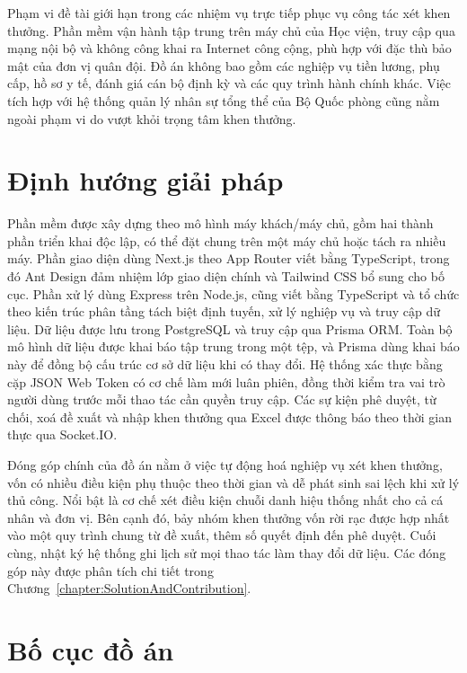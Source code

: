\documentclass[../DoAn.tex]{subfiles}
\begin{document}
Phạm vi đề tài giới hạn trong các nhiệm vụ trực tiếp phục vụ công tác xét khen thưởng.
Phần mềm vận hành tập trung trên máy chủ của Học viện, truy cập qua mạng nội bộ và không công khai ra Internet công cộng, phù hợp với đặc thù bảo mật của đơn vị quân đội.
Đồ án không bao gồm các nghiệp vụ tiền lương, phụ cấp, hồ sơ y tế, đánh giá cán bộ định kỳ và các quy trình hành chính khác.
Việc tích hợp với hệ thống quản lý nhân sự tổng thể của Bộ Quốc phòng cũng nằm ngoài phạm vi do vượt khỏi trọng tâm khen thưởng.

\section{Định hướng giải pháp}
\label{section:1.3}

Phần mềm được xây dựng theo mô hình máy khách/máy chủ, gồm hai thành phần triển khai độc lập, có thể đặt chung trên một máy chủ hoặc tách ra nhiều máy.
Phần giao diện dùng Next.js theo App Router viết bằng TypeScript, trong đó Ant Design đảm nhiệm lớp giao diện chính và Tailwind CSS bổ sung cho bố cục.
Phần xử lý dùng Express trên Node.js, cũng viết bằng TypeScript và tổ chức theo kiến trúc phân tầng tách biệt định tuyến, xử lý nghiệp vụ và truy cập dữ liệu.
Dữ liệu được lưu trong PostgreSQL và truy cập qua Prisma ORM. Toàn bộ mô hình dữ liệu được khai báo tập trung trong một tệp, và Prisma dùng khai báo này để đồng bộ cấu trúc cơ sở dữ liệu khi có thay đổi.
Hệ thống xác thực bằng cặp JSON Web Token có cơ chế làm mới luân phiên, đồng thời kiểm tra vai trò người dùng trước mỗi thao tác cần quyền truy cập.
Các sự kiện phê duyệt, từ chối, xoá đề xuất và nhập khen thưởng qua Excel được thông báo theo thời gian thực qua Socket.IO.

Đóng góp chính của đồ án nằm ở việc tự động hoá nghiệp vụ xét khen thưởng, vốn có nhiều điều kiện phụ thuộc theo thời gian và dễ phát sinh sai lệch khi xử lý thủ công.
Nổi bật là cơ chế xét điều kiện chuỗi danh hiệu thống nhất cho cả cá nhân và đơn vị. Bên cạnh đó, bảy nhóm khen thưởng vốn rời rạc được hợp nhất vào một quy trình chung từ đề xuất, thêm số quyết định đến phê duyệt. Cuối cùng, nhật ký hệ thống ghi lịch sử mọi thao tác làm thay đổi dữ liệu.
Các đóng góp này được phân tích chi tiết trong Chương~\ref{chapter:SolutionAndContribution}.

\section{Bố cục đồ án}
\label{section:1.4}
\end{document}
